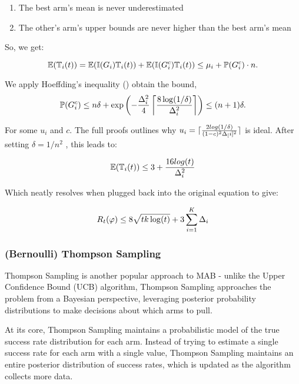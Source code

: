 \begin{enumerate}
    \item The best arm's mean is never underestimated
    \item The other's arm's upper bounds are never higher than the best arm's mean
\end{enumerate}

So, we get:


$$\mathbb{E}(\mathbb{T}_{i}(t)) = \mathbb{E}(\mathbb{I}(G_i)\mathbb{T}_{i}(t)) + \mathbb{E}(\mathbb{I}(G_i^c)\mathbb{T}_{i}(t)) \leq \mu_{i} + \mathbb{P}(G_i^c) \cdot n.$$

We apply Hoeffding's inequality () obtain the bound,
$$\mathbb{P}(G_i^c) \leq n \delta + \exp\left(-\frac{ \Delta_{i}^2}{4} \left\lceil \frac{8\log(1/\delta)}{\Delta_{i}^2} \right\rceil\right)\leq (n+1)\delta.$$

For some $u_i$ and $c$. The full proofs outlines why $u_i = \lceil \frac{2log(1/\delta)}{(1-c)^2\Delta_{[}i]^2} \rceil$ is ideal.  After setting $\delta = 1/n^2$ , this leads to:

$$\mathbb{E}(\mathbb{T}_{i}(t)) \leq 3 + \frac{16log(t)}{\Delta_{i}^2}$$

Which neatly resolves when plugged back into the original equation to give:

$$R_t(\varphi) \leq 8 \sqrt{tk \log(t)} + 3 \sum_{i=1}^{K} \Delta_{i}$$


\subsubsection{(Bernoulli) Thompson Sampling}
\label{sec:BernoulliThompsonSampling}
Thompson Sampling is another popular approach to MAB - unlike the Upper Confidence Bound (UCB) algorithm, Thompson Sampling approaches the problem from a Bayesian perspective, leveraging posterior probability distributions to make decisions about which arms to pull.

At its core, Thompson Sampling maintains a probabilistic model of the true success rate distribution for each arm. Instead of trying to estimate a single success rate for each arm with a single value, Thompson Sampling maintains an entire posterior distribution of success rates, which is updated as the algorithm collects more data.

